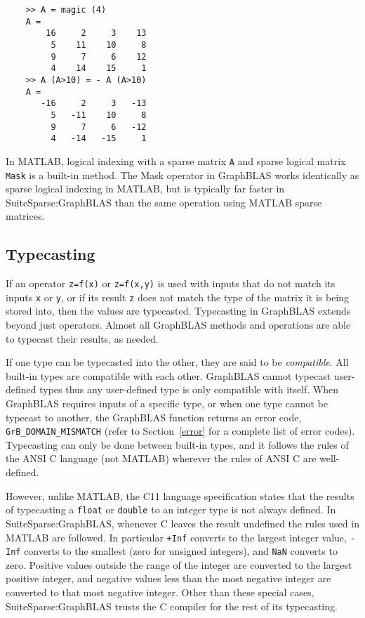 \documentclass[12pt]{article}
\begin{document}
    \begin{mdframed}
    {\footnotesize
    \begin{verbatim}
    >> A = magic (4)
    A =
        16     2     3    13
         5    11    10     8
         9     7     6    12
         4    14    15     1
    >> A (A>10) = - A (A>10)
    A =
       -16     2     3   -13
         5   -11    10     8
         9     7     6   -12
         4   -14   -15     1 \end{verbatim} } \end{mdframed}

In MATLAB, logical indexing with a sparse matrix \verb'A' and sparse logical
matrix \verb'Mask' is a built-in method.  The Mask operator in GraphBLAS works
identically as sparse logical indexing in MATLAB, but is typically far faster
in SuiteSparse:GraphBLAS than the same operation using MATLAB sparse matrices.

\subsection{Typecasting} %
\label{typecasting}

If an operator \verb'z=f(x)' or \verb'z=f(x,y)' is used with inputs that do not
match its inputs \verb'x' or \verb'y', or if its result \verb'z' does not match
the type of the matrix it is being stored into, then the values are typecasted.
Typecasting in GraphBLAS extends beyond just operators.  Almost all GraphBLAS
methods and operations are able to typecast their results, as needed.

If one type can be typecasted into the other, they are said to be {\em
compatible}.  All built-in types are compatible with each other.  GraphBLAS
cannot typecast user-defined types thus any user-defined type is only
compatible with itself.  When GraphBLAS requires inputs of a specific type, or
when one type cannot be typecast to another, the GraphBLAS function returns an
error code, \verb'GrB_DOMAIN_MISMATCH' (refer to Section~\ref{error} for a
complete list of error codes).  Typecasting can only be done between built-in
types, and it follows the rules of the ANSI C language (not MATLAB) wherever
the rules of ANSI C are well-defined.

However, unlike MATLAB, the C11 language specification states that the
results of typecasting a \verb'float' or \verb'double' to an integer type is
not always defined.  In SuiteSparse:GraphBLAS, whenever C leaves the result
undefined the rules used in MATLAB are followed.  In particular \verb'+Inf'
converts to the largest integer value, \verb'-Inf' converts to the smallest
(zero for unsigned integers), and \verb'NaN' converts to zero.  Positive values
outside the range of the integer are converted to the largest positive integer,
and negative values less than the most negative integer are converted to that
most negative integer.  Other than these special cases, SuiteSparse:GraphBLAS
trusts the C compiler for the rest of its typecasting.
\end{document}
